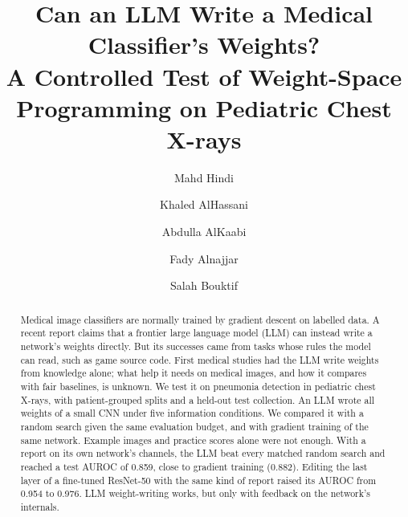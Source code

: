 \documentclass[runningheads]{llncs}
\begin{document}
\title{Can an LLM Write a Medical Classifier's Weights?\\
A Controlled Test of Weight-Space Programming on Pediatric Chest X-rays}


\author{Mahd Hindi \and
Khaled AlHassani \and
Abdulla AlKaabi \and
Fady Alnajjar \and
Salah Bouktif}



\maketitle

\begin{abstract}
Medical image classifiers are normally trained by gradient descent on labelled data.
A recent report claims that a frontier large language model (LLM) can instead write a network's weights directly.
But its successes came from tasks whose rules the model can read, such as game source code.
First medical studies had the LLM write weights from knowledge alone; what help it needs on medical images, and how it compares with fair baselines, is unknown.
We test it on pneumonia detection in pediatric chest X-rays, with patient-grouped splits and a held-out test collection.
An LLM wrote all weights of a small CNN under five information conditions.
We compared it with a random search given the same evaluation budget, and with gradient training of the same network.
Example images and practice scores alone were not enough.
With a report on its own network's channels, the LLM beat every matched random search and reached a test AUROC of 0.859, close to gradient training (0.882).
Editing the last layer of a fine-tuned ResNet-50 with the same kind of report raised its AUROC from 0.954 to 0.976.
LLM weight-writing works, but only with feedback on the network's internals.
\end{abstract}

\end{document}
